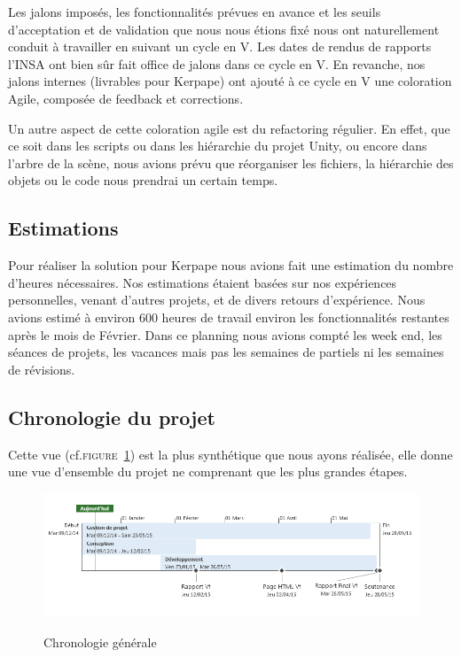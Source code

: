 Les jalons imposés, les fonctionnalités prévues en avance et les seuils d'acceptation et de validation que nous nous étions fixé nous ont naturellement conduit à travailler en suivant un cycle en V.
Les dates de rendus de rapports l'INSA ont bien sûr fait office de jalons dans ce cycle en V.
En revanche, nos jalons internes (livrables pour Kerpape) ont ajouté à ce cycle en V une coloration Agile, composée de feedback et corrections.

Un autre aspect de cette coloration agile est du refactoring régulier.
En effet, que ce soit dans les scripts ou dans les hiérarchie du projet Unity, ou encore dans l'arbre de la scène, nous avions prévu que réorganiser les fichiers, la hiérarchie des objets ou le code nous prendrai un certain temps.

\subsection{Estimations}

Pour réaliser la solution pour Kerpape nous avions fait une estimation du nombre d'heures nécessaires.
Nos estimations étaient basées sur nos expériences personnelles, venant d'autres projets, et de divers retours d'expérience.
Nous avions estimé à environ 600 heures de travail environ les fonctionnalités restantes après le mois de Février.
Dans ce planning nous avions compté les week end, les séances de projets, les vacances mais pas les semaines de partiels ni les semaines de révisions.

\subsection{Chronologie du projet}
Cette vue (cf.\textsc{figure~\ref{fig:timeline}}) est la plus synthétique que nous ayons réalisée, elle donne une vue d’ensemble du projet ne comprenant que les plus grandes étapes. 
\begin{figure}
	\centering
	\caption{Chronologie générale}
		\includegraphics[width=\textwidth]{8-BilanPlanification/img/timeline.PNG}
	\label{fig:timeline}
\end{figure}


